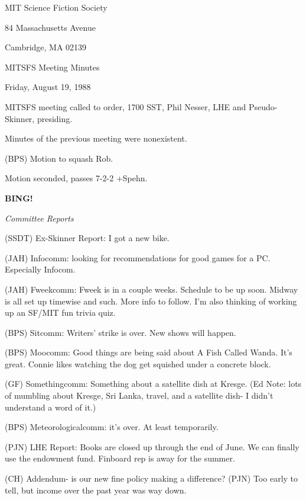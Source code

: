 \documentclass[12pt]{article}
\newcommand{\bing}{{\bf BING!} }
\newcommand{\goto}[1]{\bing \vskip 12pt \centerline{{\em{#1}}}}
\begin{document}
\begin{center}

MIT Science Fiction Society 

84 Massachusetts Avenue

Cambridge, MA 02139

\vspace{12pt}

MITSFS Meeting Minutes 

Friday, August 19, 1988

\end{center}
 
\vspace{18pt}

\setlength{\parskip}{6pt}

\noindent
MITSFS meeting called to order, 1700 SST,
Phil Nesser, LHE and Pseudo-Skinner, presiding.

Minutes of the previous meeting were nonexistent.

(BPS) Motion to squash Rob.

Motion seconded, passes 7-2-2 +Spehn.

\goto{Committee Reports}

(SSDT) Ex-Skinner Report: I got a new bike.

(JAH) Infocomm: looking for recommendations for good games for a PC. Especially Infocom.

(JAH) Fweekcomm: Fweek is in a couple weeks. Schedule to be up soon. Midway is all set up timewise and such. More info to follow. I'm also thinking of working up an SF/MIT fun trivia quiz.

(BPS) Sitcomm: Writers' strike is over. New shows will happen.

(BPS) Moocomm: Good things are being said about A Fish Called Wanda. It's great. Connie likes watching the dog get squished under a concrete block.

(GF) Somethingcomm: Something about a satellite dish at Kresge. (Ed Note: lots of mumbling about Kresge, Sri Lanka, travel, and a satellite dish- I didn't understand a word of it.)

(BPS) Meteorologicalcomm: it's over. At least temporarily.

(PJN) LHE Report: Books are closed up through the end of June. We can finally use the endowment fund. Finboard rep is away for the summer.

(CH) Addendum- is our new fine policy making a difference? (PJN) Too early to tell, but income over the past year was way down.
\end{document}
